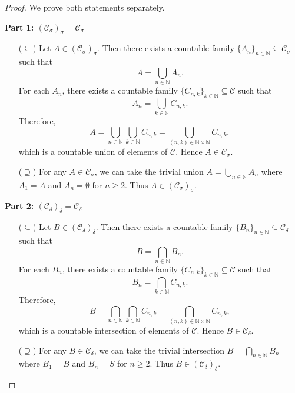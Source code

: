 \documentclass[../main.tex]{subfiles}
\begin{document}
\begin{proof}
We prove both statements separately.

\noindent
\textbf{Part 1: $(\mathcal{C}_\sigma)_\sigma = \mathcal{C}_\sigma$}

\begin{enumerate}
    \item[($\subseteq$)] Let $A \in (\mathcal{C}_\sigma)_\sigma$. Then there exists a countable family $\{A_n\}_{n\in\mathbb{N}} \subseteq \mathcal{C}_\sigma$ such that
    $$
    A = \bigcup_{n\in\mathbb{N}} A_n.
    $$
    For each $A_n$, there exists a countable family $\{C_{n,k}\}_{k\in\mathbb{N}} \subseteq \mathcal{C}$ such that
    $$
    A_n = \bigcup_{k\in\mathbb{N}} C_{n,k}.
    $$
    Therefore,
    $$
    A = \bigcup_{n\in\mathbb{N}} \bigcup_{k\in\mathbb{N}} C_{n,k} = \bigcup_{(n,k)\in\mathbb{N}\times\mathbb{N}} C_{n,k},
    $$
    which is a countable union of elements of $\mathcal{C}$. Hence $A \in \mathcal{C}_\sigma$.

    \item[($\supseteq$)] For any $A \in \mathcal{C}_\sigma$, we can take the trivial union $A = \bigcup_{n\in\mathbb{N}} A_n$ where $A_1 = A$ and $A_n = \emptyset$ for $n \geq 2$. Thus $A \in (\mathcal{C}_\sigma)_\sigma$.
\end{enumerate}

\noindent
\textbf{Part 2: $(\mathcal{C}_\delta)_\delta = \mathcal{C}_\delta$}

\begin{enumerate}
    \item[($\subseteq$)] Let $B \in (\mathcal{C}_\delta)_\delta$. Then there exists a countable family $\{B_n\}_{n\in\mathbb{N}} \subseteq \mathcal{C}_\delta$ such that
    $$
    B = \bigcap_{n\in\mathbb{N}} B_n.
    $$
    For each $B_n$, there exists a countable family $\{C_{n,k}\}_{k\in\mathbb{N}} \subseteq \mathcal{C}$ such that
    $$
    B_n = \bigcap_{k\in\mathbb{N}} C_{n,k}.
    $$
    Therefore,
    $$
    B = \bigcap_{n\in\mathbb{N}} \bigcap_{k\in\mathbb{N}} C_{n,k} = \bigcap_{(n,k)\in\mathbb{N}\times\mathbb{N}} C_{n,k},
    $$
    which is a countable intersection of elements of $\mathcal{C}$. Hence $B \in \mathcal{C}_\delta$.

    \item[($\supseteq$)] For any $B \in \mathcal{C}_\delta$, we can take the trivial intersection $B = \bigcap_{n\in\mathbb{N}} B_n$ where $B_1 = B$ and $B_n = S$ for $n \geq 2$. Thus $B \in (\mathcal{C}_\delta)_\delta$.
\end{enumerate}
\end{proof}
\end{document}
